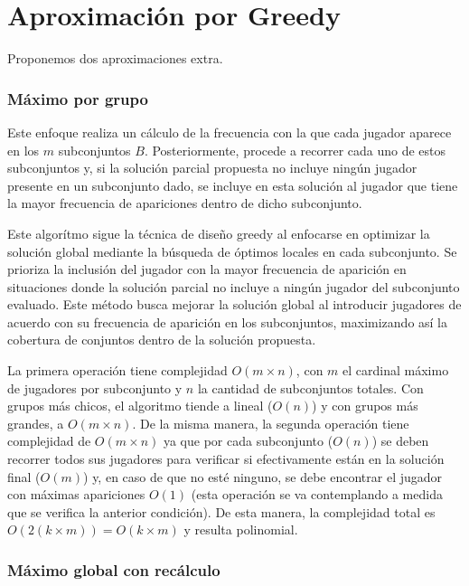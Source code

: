 \section{Aproximación por Greedy}

Proponemos dos aproximaciones extra.

\subsubsection{Máximo por grupo}
Este enfoque realiza un cálculo de la frecuencia con la que cada jugador aparece en los $m$ subconjuntos $B$. Posteriormente, procede a recorrer cada uno de estos subconjuntos y, si la solución parcial propuesta no incluye ningún jugador presente en un subconjunto dado, se incluye en esta solución al jugador que tiene la mayor frecuencia de apariciones dentro de dicho subconjunto.

Este algorítmo sigue la técnica de diseño greedy al enfocarse en optimizar la solución global mediante la búsqueda de óptimos locales en cada subconjunto. Se prioriza la inclusión del jugador con la mayor frecuencia de aparición en situaciones donde la solución parcial no incluye a ningún jugador del subconjunto evaluado. Este método busca mejorar la solución global al introducir jugadores de acuerdo con su frecuencia de aparición en los subconjuntos, maximizando así la cobertura de conjuntos dentro de la solución propuesta.



La primera operación tiene complejidad $O(m \times n)$, con $m$ el cardinal máximo de jugadores por subconjunto y $n$ la cantidad de subconjuntos totales. Con grupos más chicos, el algoritmo tiende a lineal ($O(n)$) y con grupos más grandes, a $O(m\times n)$. 
De la misma manera, la segunda operación tiene complejidad de  $O(m\times n)$ ya que por cada subconjunto ($O(n)$) se deben recorrer todos sus jugadores para verificar si efectivamente están en la solución final ($O(m)$) y, en caso de que no esté ninguno, se debe encontrar el jugador con máximas apariciones $O(1)$ (esta operación se va contemplando a medida que se verifica la anterior condición). De esta manera, la complejidad total es $O(2(k \times m))=O(k \times m)$ y resulta polinomial.

\subsubsection{Máximo global con recálculo}

